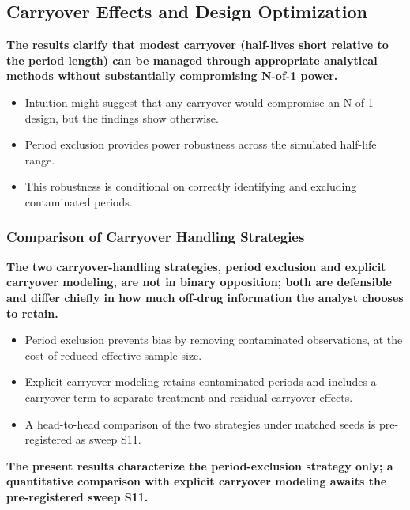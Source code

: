 \documentclass[
  11pt,
]{article}
\begin{document}
\subsection{Carryover Effects and Design Optimization}\label{carryover-effects-and-design-optimization}

\textbf{The results clarify that modest carryover (half-lives short relative to the period length) can be managed through appropriate analytical methods without substantially compromising N-of-1 power.}

\begin{itemize}\setlength{\itemsep}{2pt}\setlength{\parskip}{0pt}
\item Intuition might suggest that any carryover would compromise an N-of-1 design, but the findings show otherwise.
\item Period exclusion provides power robustness across the simulated half-life range.
\item This robustness is conditional on correctly identifying and excluding contaminated periods.
\end{itemize}

\subsubsection{Comparison of Carryover Handling Strategies}\label{comparison-of-carryover-handling-strategies}

\textbf{The two carryover-handling strategies, period exclusion and explicit carryover modeling, are not in binary opposition; both are defensible and differ chiefly in how much off-drug information the analyst chooses to retain.}

\begin{itemize}\setlength{\itemsep}{2pt}\setlength{\parskip}{0pt}
\item Period exclusion prevents bias by removing contaminated observations, at the cost of reduced effective sample size.
\item Explicit carryover modeling retains contaminated periods and includes a carryover term to separate treatment and residual carryover effects.
\item A head-to-head comparison of the two strategies under matched seeds is pre-registered as sweep S11.
\end{itemize}

\textbf{The present results characterize the period-exclusion strategy only; a quantitative comparison with explicit carryover modeling awaits the pre-registered sweep S11.}
\end{document}
